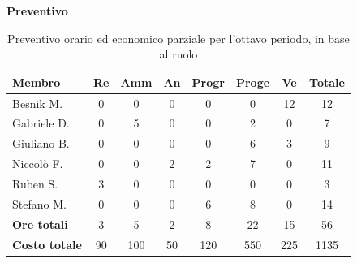 \documentclass[a4paper,10pt]{article}
\begin{document}
\textbf{Preventivo} \\
\begin{table}[H]
\centering
\begin{tabular}{|l|c|c|c|c|c|c|c|}
\hline
\textbf{Membro} & \textbf{Re} & \textbf{Amm} & \textbf{An} & \textbf{Progr} & \textbf{Proge} & \textbf{Ve} & \textbf{Totale} \\
\hline
Besnik M.   & 0   & 0   & 0 & 0   & 0 & 12 & 12 \\
Gabriele D. & 0   & 5   & 0 & 0   & 2 & 0  & 7 \\
Giuliano B. & 0   & 0   & 0 & 0   & 6 & 3  & 9 \\
Niccolò F.  & 0   & 0   & 2 & 2   & 7 & 0  & 11 \\
Ruben S.    & 3   & 0   & 0 & 0   & 0 & 0  & 3 \\
Stefano M.  & 0   & 0   & 0 & 6   & 8 & 0  & 14 \\
\hline
\textbf{Ore totali} & 3  & 5 & 2 & 8  & 22  & 15 & 56 \\
\hline
\textbf{Costo totale} & 90  & 100 & 50 & 120  & 550  & 225 & 1135 \\
\hline
\end{tabular}
\caption{Preventivo orario ed economico parziale per l'ottavo periodo, in base al ruolo}
\end{table}
\end{document}
